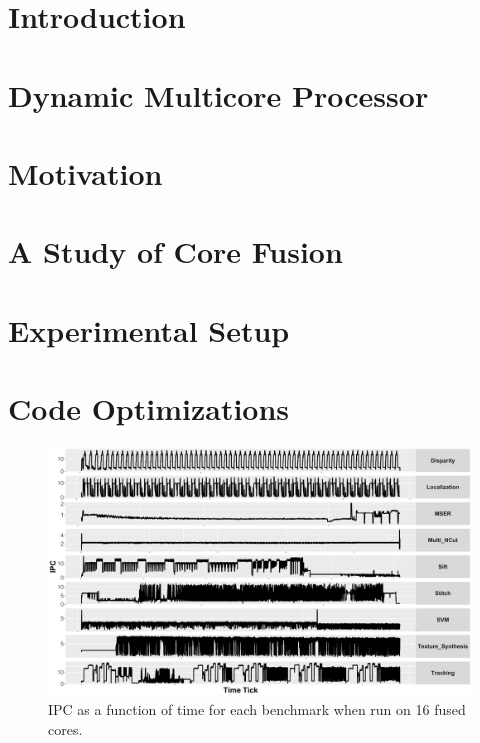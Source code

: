 \documentclass[format=acmsmall, review=false, screen=true]{acmart}
\begin{document}

\maketitle

\section{Introduction}\label{sect:introduction}


\section{Dynamic Multicore Processor}\label{sect:background}


\vspace{-2mm}
\section{Motivation}\label{sec:motivation}


\section{A Study of Core Fusion}\label{sec:lim_study}


\section{Experimental Setup}\label{sec:setup}


\section{Code Optimizations}\label{sec:opt}


\begin{figure}[t]
    \centering
    \includegraphics[width=1\textwidth]{graphics/Exploration/ipcs_16_2.pdf}
    \vspace*{-8mm}
    \caption{IPC as a function of time for each benchmark when run on 16 fused cores.}
    \label{fig:sxt}
\vspace{5mm}
\end{figure}
\end{document}
